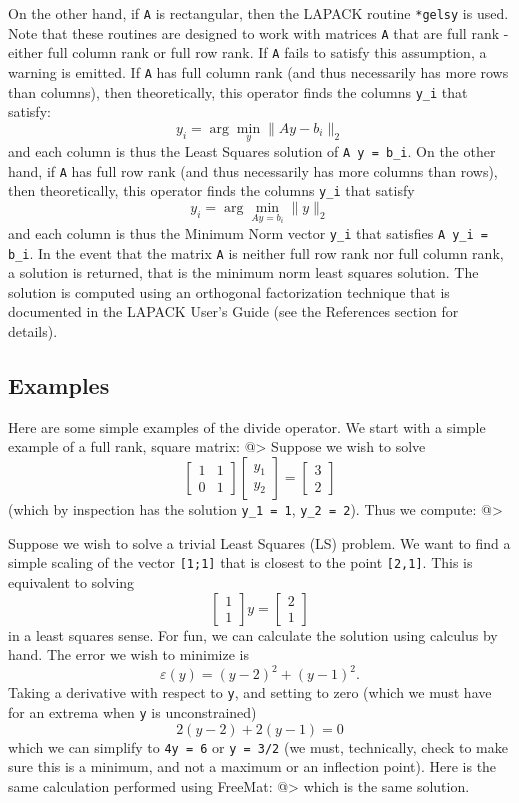 On the other hand, if \verb|A| is rectangular, then the LAPACK routine \verb|*gelsy| is used.  Note that these routines are designed to work with matrices \verb|A| that are full rank - either full column rank or full row rank.  If \verb|A| fails to satisfy this assumption, a warning is emitted.  If \verb|A| has full column rank (and thus necessarily has more rows than columns), then theoretically, this operator finds the columns \verb|y_i| that satisfy:
\[
  y_i = \arg \min_y \| A y - b_i \|_2
\]
and each column is thus the Least Squares solution of \verb|A y = b_i|.  On the other hand, if \verb|A| has full row rank (and thus necessarily has more columns than rows), then theoretically, this operator finds the columns \verb|y_i| that satisfy
\[
  y_i = \arg \min_{A y = b_i} \| y \|_2
\]
and each column is thus the Minimum Norm vector \verb|y_i| that satisfies \verb|A y_i = b_i|.  
In the event that the matrix \verb|A| is neither full row rank nor full column rank, a solution is returned, that is the minimum norm least squares solution.  The solution is computed using an orthogonal factorization technique that is documented in the LAPACK User's Guide (see the References section for details).
\subsection{Examples}

Here are some simple examples of the divide operator.  We start with a simple example of a full rank, square matrix:
@>
Suppose we wish to solve
\[
  \begin{bmatrix} 1 & 1 \\ 0 & 1 \end{bmatrix}
  \begin{bmatrix} y_1 \\ y_2 \end{bmatrix}
 = 
  \begin{bmatrix} 3 \\ 2 \end{bmatrix}
\]
(which by inspection has the solution \verb|y_1 = 1|, \verb|y_2 = 2|).  Thus we compute:
@>

Suppose we wish to solve a trivial Least Squares (LS) problem.  We want to find a simple scaling of the vector \verb|[1;1]| that is closest to the point \verb|[2,1]|.  This is equivalent to solving
\[
\begin{bmatrix} 1 \\ 1 \end{bmatrix} y = \begin{bmatrix} 2 \\ 1 \end{bmatrix}
\]
in a least squares sense.  For fun, we can calculate the solution using calculus by hand.  The error we wish to minimize is
\[
  \varepsilon(y) = (y - 2)^2 + (y-1)^2.
\]
Taking a derivative with respect to \verb|y|, and setting to zero (which we must have for an extrema when \verb|y| is unconstrained)
\[
  2 (y-2) + 2 (y-1) = 0
\]
which we can simplify to \verb|4y = 6| or \verb|y = 3/2| (we must, technically, check to make sure this is a minimum, and not a maximum or an inflection point).  Here is the same calculation performed using FreeMat:
@>
which is the same solution.
